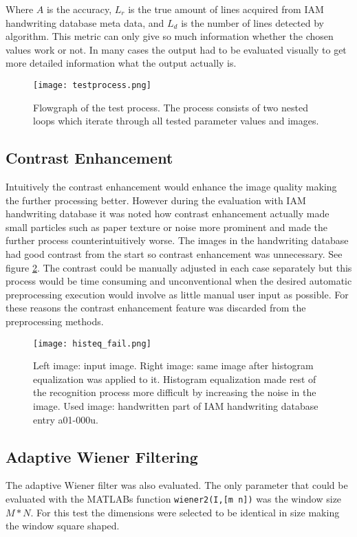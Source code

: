 \documentclass{article}
\def\code#1{\texttt{#1}}
\begin{document}
    Where $A$ is the accuracy, $L_r$ is the true amount of lines acquired from IAM handwriting database meta data, and $L_d$ is the number of lines detected by algorithm. This metric can only give so much information whether the chosen values work or not. In many cases the output had to be evaluated visually to get more detailed information what the output actually is.

    \begin{figure}[!ht]
      \centering
      \texttt{[image: testprocess.png]}
      \caption{Flowgraph of the test process. The process consists of two nested loops which iterate through all tested parameter values and images.
      \label{fig:testprocess}}
    \end{figure}

  \subsection{Contrast Enhancement}
    Intuitively the contrast enhancement would enhance the image quality making the further processing better. However during the evaluation with IAM handwriting database it was noted how contrast enhancement actually made small particles such as paper texture or noise more prominent and made the further process counterintuitively worse. The images in the handwriting database had good contrast from the start so contrast enhancement was unnecessary. See figure \ref{fig:histeqfail}. The contrast could be manually adjusted in each case separately but this process would be time consuming and unconventional when the desired automatic preprocessing execution would involve as little manual user input as possible. For these reasons the contrast enhancement feature was discarded from the preprocessing methods.

    \begin{figure}[!ht]
      \centering
      \texttt{[image: histeq\_fail.png]}
      \caption{Left image: input image. Right image: same image after histogram equalization was applied to it. Histogram equalization made rest of the recognition process more difficult by increasing the noise in the image. Used image: handwritten part of IAM handwriting database entry a01-000u.
      \label{fig:histeqfail}}
    \end{figure}

  \subsection{Adaptive Wiener Filtering}
    The adaptive Wiener filter was also evaluated. The only parameter that could be evaluated with the MATLABs function \code{wiener2(I,[m n])} was the window size $M * N$. For this test the dimensions were selected to be identical in size making the window square shaped.
\end{document}
